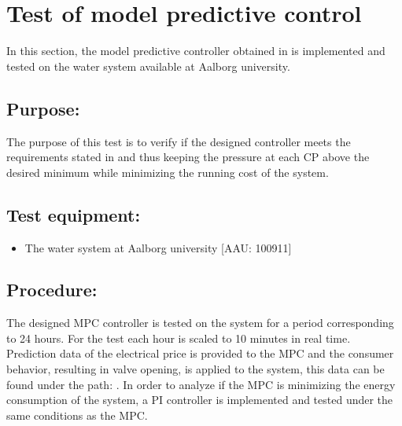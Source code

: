 \section{Test of model predictive control}
\label{sec:MPT_test}

In this section, the model predictive controller obtained in  is implemented and tested on the water system available at Aalborg university. 

\subsection*{Purpose:}

The purpose of this test is to verify if the designed controller meets the requirements stated in  and thus keeping the pressure at each CP above the desired minimum while minimizing the running cost of the system.

\subsection*{Test equipment:}
\begin{itemize}
\item The water system at Aalborg university [AAU: 100911]
\end{itemize}

\subsection*{Procedure:}
The designed MPC controller is tested on the system for a period corresponding to 24 hours. For the test each hour is scaled to 10 minutes in real time. Prediction data of the electrical price is provided to the MPC and the consumer behavior, resulting in valve opening, is applied to the system, this data can be found under the path: . 
In order to analyze if the MPC is minimizing the energy consumption of the system, a PI controller is implemented and tested under the same conditions as the MPC.    





